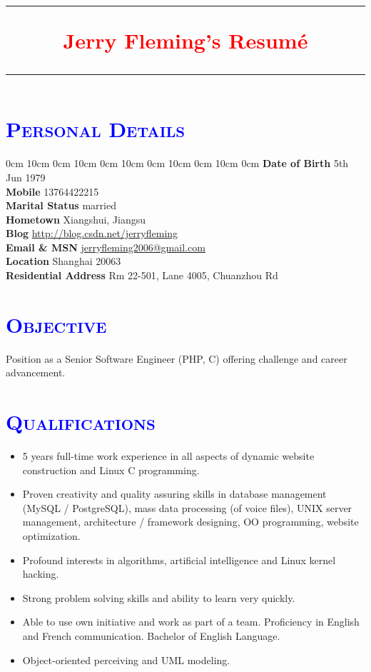 \documentclass[a4paper,12pt]{article}
\newcommand{\itembf}[1]{%
  \textbf{\textcolor{bfcolor}{#1}}}
\newcommand{\ssection}[1]{%
  \section[#1]{\normalsize\scshape\textcolor{blue}{#1}}}
\begin{document}
\thispagestyle{plain}
\sffamily

\title{%
\rule[1mm]{.2\textwidth}{5pt}
\textcolor{red}{\LARGE\textbf{Jerry Fleming's Resum\'e}}
\rule[1mm]{.2\textwidth}{5pt}}
\author{}
\date{}
\maketitle

\ssection{Personal Details}
0cm 10cm 0cm 10cm
0cm 10cm 0cm 10cm
0cm 10cm 0cm \linewidth
\leavevmode{}%
\itembf{Date of Birth} 5th Jun 1979\\
\itembf{Mobile} 13764422215\\
\itembf{Marital Status} married\\
\itembf{Hometown} Xiangshui, Jiangsu\\
\itembf{Blog} \href{http://blog.csdn.net/jerryfleming}{http://blog.csdn.net/jerryfleming}\\
\itembf{Email \& MSN} \href{mailto:jerryfleming2006@gmail.com}{jerryfleming2006@gmail.com}\\
\itembf{Location} Shanghai 20063\\
\itembf{Residential Address} Rm 22-501, Lane 4005, Chuanzhou Rd

\ssection{Objective}
Position as a Senior Software Engineer (PHP, C) offering challenge and career advancement.

\ssection{Qualifications}
\begin{itemize}
	\item 5 years full-time work experience in all aspects of dynamic website construction and Linux C programming.
	\item Proven creativity and quality assuring skills in database management (MySQL / PostgreSQL), mass data processing (of voice files), UNIX server management, architecture / framework designing, OO programming, website optimization.
	\item Profound interests in algorithms, artificial intelligence and Linux kernel hacking.
	\item Strong problem solving skills and ability to learn very quickly.
	\item Able to use own initiative and work as part of a team. Proficiency in English and French communication. Bachelor of English Language.
	\item Object-oriented perceiving and UML modeling.
\end{itemize}
\end{document}
